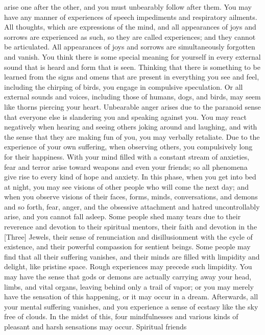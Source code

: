 \documentclass[a4paper,11pt,twoside,final]{book}
\begin{document}
arise one after the other, and you must unbearably follow after
them. You may have any manner of experiences of speech impediments and
respiratory ailments. All thoughts, which are expressions of the mind,
and all appearances of joys and sorrows are experienced as such, so
they are called experiences; and they cannot be articulated. All
appearances of joys and sorrows are simultaneously forgotten and
vanish. You think there is some special meaning for yourself in every
external sound that is heard and form that is seen. Thinking that
there is something to be learned from the signs and omens that are
present in everything you see and feel, including the chirping of
birds, you engage in compulsive speculation. Or all external sounds
and voices, including those of humans, dogs, and birds, may seem like
thorns piercing your heart. Unbearable anger arises due to the
paranoid sense that everyone else is slandering you and speaking
against you. You may react negatively when hearing and seeing others
joking around and laughing, and with the sense that they are making
fun of you, you may verbally retaliate. Due to the experience of your
own suffering, when observing others, you compulsively long for their
happiness. With your mind filled with a constant stream of anxieties,
fear and terror arise toward weapons and even your friends; so all
phenomena give rise to every kind of hope and anxiety. In this phase,
when you get into bed at night, you may see visions of other people
who will come the next day; and when you observe visions of their
faces, forms, minds, conversations, and demons and so forth, fear,
anger, and the obsessive attachment and hatred uncontrollably arise,
and you cannot fall asleep.  Some people shed many tears due to their
reverence and devotion to their spiritual mentors, their faith and
devotion in the [Three] Jewels, their sense of renunciation and
disillusionment with the cycle of existence, and their powerful
compassion for sentient beings. Some people may find that all their
suffering vanishes, and their minds are filled with limpidity and
delight, like pristine space. Rough experiences may precede such
limpidity. You may have the sense that gods or demons are actually
carrying away your head, limbs, and vital organs, leaving behind only
a trail of vapor; or you may merely have the sensation of this
happening, or it may occur in a dream. Afterwards, all your mental
suffering vanishes, and you experience a sense of ecstasy like the sky
free of clouds. In the midst of this, four mindfulnesses and various
kinds of pleasant and harsh sensations may occur. Spiritual friends
\end{document}
